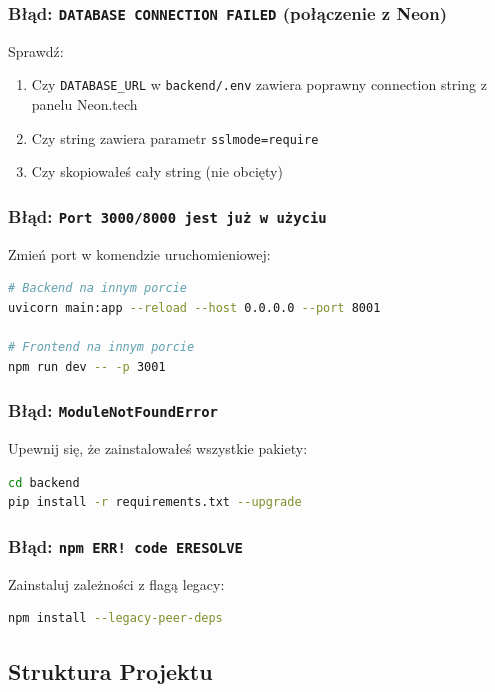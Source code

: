 \documentclass[12pt,a4paper]{article}
\begin{document}
\subsubsection{Błąd: \texttt{DATABASE CONNECTION FAILED} (połączenie z Neon)}

Sprawdź:
\begin{enumerate}
    \item Czy \texttt{DATABASE\_URL} w \texttt{backend/.env} zawiera poprawny connection string z panelu Neon.tech
    \item Czy string zawiera parametr \texttt{sslmode=require}
    \item Czy skopiowałeś cały string (nie obcięty)
\end{enumerate}

\subsubsection{Błąd: \texttt{Port 3000/8000 jest już w użyciu}}

Zmień port w komendzie uruchomieniowej:
\begin{lstlisting}[language=bash]
# Backend na innym porcie
uvicorn main:app --reload --host 0.0.0.0 --port 8001

# Frontend na innym porcie
npm run dev -- -p 3001
\end{lstlisting}

\subsubsection{Błąd: \texttt{ModuleNotFoundError}}

Upewnij się, że zainstalowałeś wszystkie pakiety:
\begin{lstlisting}[language=bash]
cd backend
pip install -r requirements.txt --upgrade
\end{lstlisting}

\subsubsection{Błąd: \texttt{npm ERR! code ERESOLVE}}

Zainstaluj zależności z flagą legacy:
\begin{lstlisting}[language=bash]
npm install --legacy-peer-deps
\end{lstlisting}

\subsection{Struktura Projektu}
\end{document}

